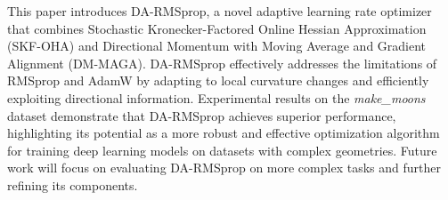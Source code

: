 \documentclass[a4paper,11pt]{article}
\begin{document}
This paper introduces DA-RMSprop, a novel adaptive learning rate optimizer that combines Stochastic Kronecker-Factored Online Hessian Approximation (SKF-OHA) and Directional Momentum with Moving Average and Gradient Alignment (DM-MAGA). DA-RMSprop effectively addresses the limitations of RMSprop and AdamW by adapting to local curvature changes and efficiently exploiting directional information. Experimental results on the \textit{make\_moons} dataset demonstrate that DA-RMSprop achieves superior performance, highlighting its potential as a more robust and effective optimization algorithm for training deep learning models on datasets with complex geometries. Future work will focus on evaluating DA-RMSprop on more complex tasks and further refining its components.



\end{document}
